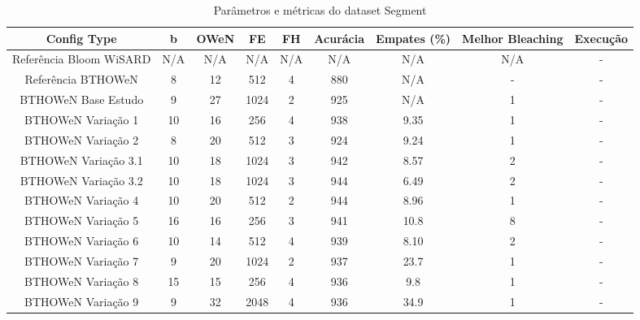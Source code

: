 \documentclass{article}
\begin{document}
{\begin{longtable}{|c|c|c|c|c|c|c|c|c|}
\caption{Parâmetros e métricas do dataset Segment} \\
\hline
\textbf{Config Type} & \textbf{b} & \textbf{OWeN} & \textbf{FE} & \textbf{FH} & \textbf{Acurácia} & \textbf{Empates (\%)} & \textbf{Melhor Bleaching} & \textbf{Execução} \\
\hline
Referência Bloom WiSARD & N/A & N/A & N/A & N/A & N/A & N/A & N/A & - \\
\hline
Referência BTHOWeN & 8 & 12 & 512 & 4 & 880 & N/A & - & - \\
\hline
BTHOWeN Base Estudo & 9 & 27 & 1024 & 2 & 925 & N/A & 1 & - \\
\hline
BTHOWeN Variação 1 & 10 & 16 & 256 & 4 & 938 & 9.35 & 1 & - \\
\hline
BTHOWeN Variação 2 & 8 & 20 & 512 & 3 & 924 & 9.24 & 1 & - \\
\hline
BTHOWeN Variação 3.1 & 10 & 18 & 1024 & 3 & 942 & 8.57 & 2 & - \\
\hline
BTHOWeN Variação 3.2 & 10 & 18 & 1024 & 3 & 944 & 6.49 & 2 & - \\
\hline
BTHOWeN Variação 4 & 10 & 20 & 512 & 2 & 944 & 8.96 & 1 & - \\
\hline
BTHOWeN Variação 5 & 16 & 16 & 256 & 3 & 941 & 10.8 & 8 & - \\
\hline
BTHOWeN Variação 6 & 10 & 14 & 512 & 4 & 939 & 8.10 & 2 & - \\
\hline
BTHOWeN Variação 7 & 9 & 20 & 1024 & 2 & 937 & 23.7 & 1 & - \\
\hline
BTHOWeN Variação 8 & 15 & 15 & 256 & 4 & 936 & 9.8 & 1 & - \\
\hline
BTHOWeN Variação 9 & 9 & 32 & 2048 & 4 & 936 & 34.9 & 1 & - \\
\hline
\end{longtable}

}
\end{document}
